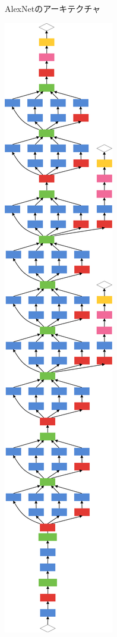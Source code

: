 {\begin{figure}[h]
  \caption{AlexNetのアーキテクチャ}
  \label{fig:alexnet}
\end{figure}

\begin{figure}[h]
  \centering
  \includegraphics[width=1.0\hsize]{./chap2/fig/googlenet.png}

\end{figure}}
